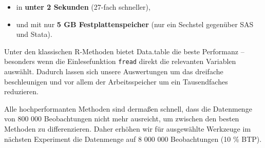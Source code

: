 \documentclass[
  german,
  10pt,
  twoside]{article}
\providecommand{\tightlist}{%
  \setlength{\itemsep}{0pt}\setlength{\parskip}{0pt}}
\let\oldtextbf\textbf
\renewcommand{\textbf}[1]{{\color{wistaBlue}\oldtextbf{#1}}}
\begin{document}
\begin{itemize}
\tightlist
\item
  in \textbf{unter 2 Sekunden} (27-fach schneller),
\item
  und mit nur \textbf{5 GB Festplattenspeicher} (nur ein Sechstel
  gegenüber SAS und Stata).
\end{itemize}

Unter den klassischen R-Methoden bietet Data.table die beste Performanz
-- besonders wenn die Einlesefunktion \texttt{fread} direkt die
relevanten Variablen auswählt. Dadurch lassen sich unsere Auswertungen
um das dreifache beschleunigen und vor allem der Arbeitsspeicher um ein
Tausendfaches reduzieren.

Alle hochperformanten Methoden sind dermaßen schnell, dass die
Datenmenge von 800 000 Beobachtungen nicht mehr ausreicht, um zwischen
den besten Methoden zu differenzieren. Daher erhöhen wir für ausgewählte
Werkzeuge im nächsten Experiment die Datenmenge auf 8 000 000
Beobachtungen (10 \% BTP).
\end{document}
